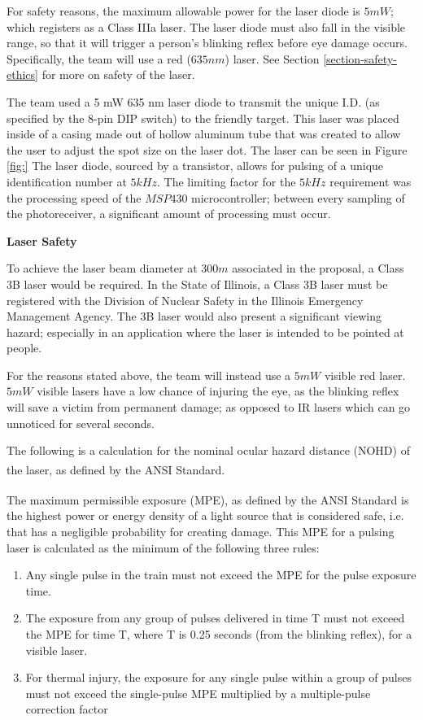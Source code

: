 \documentclass[letterpaper,10pt]{article}
\begin{document}
\begin{spacing}{1.15}
For safety reasons, the maximum allowable power for the laser diode is $5mW$; which registers as a Class IIIa laser. The laser diode must also fall in the visible range, so that it will trigger a person's blinking reflex before eye damage occurs. Specifically, the team will use a red ($635nm$) laser. See Section \ref{section-safety-ethics} for more on safety of the laser. 

The team used a 5 mW 635 nm laser diode to transmit the unique I.D. (as specified by the 8-pin DIP switch) to the friendly target. This laser was placed inside of a casing made out of hollow aluminum tube that was created to allow the user to adjust the spot size on the laser dot. The laser can be seen in Figure \ref{fig:} The laser diode, sourced by a transistor, allows for pulsing of a unique identification number at $5kHz$. The limiting factor for the $5kHz$ requirement was the processing speed of the $MSP430$ microcontroller; between every sampling of the photoreceiver, a significant amount of processing must occur. 



 
\hspace{5mm}\textbf{Laser Safety}

 To achieve the laser beam diameter at $300 m$ associated in the proposal, a Class 3B laser would be required. In the State of Illinois, a Class 3B laser must be registered with the Division of Nuclear Safety in the Illinois Emergency Management Agency. The 3B laser would also present a significant viewing hazard; especially in an application where the laser is intended to be pointed at people. 
 
 For the reasons stated above, the team will instead use a $5mW$ visible red laser. $5mW$ visible lasers have a low chance of injuring the eye, as the blinking reflex will save a victim from permanent damage; as opposed to IR lasers which can go unnoticed for several seconds. 
 
 The following is a calculation for the nominal ocular hazard distance (NOHD) of the laser, as defined by the ANSI Standard\textsuperscript{\cite{ANSI}}.
 
 The maximum permissible exposure (MPE), as defined by the ANSI Standard \textsuperscript{\cite{ANSI}} is the highest power or energy density of a light source that is considered safe, i.e. that has a negligible probability for creating damage. This MPE for a pulsing laser is calculated as the minimum of the following three rules:
 
 \begin{enumerate}
 	\item Any single pulse in the train must not exceed the MPE for the pulse exposure time.
 	\item The exposure from any group of pulses delivered in time T must not exceed the MPE for
 	time T, where T is 0.25 seconds (from the blinking reflex), for a visible laser. 
 	\item For thermal injury, the exposure for any single pulse within a group of pulses must not
 	exceed the single-pulse MPE multiplied by a multiple-pulse correction factor
 \end{enumerate}
 

\end{spacing}
\end{document}
